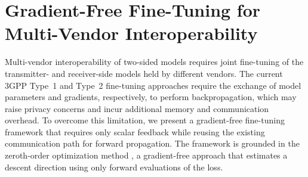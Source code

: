 \documentclass[10pt,twocolumn]{IEEEtran}
\begin{document}






\section{Gradient-Free Fine-Tuning for Multi-Vendor Interoperability}
Multi-vendor interoperability of two-sided models requires joint fine-tuning of the transmitter- and receiver-side models held by different vendors. The current 3GPP Type~1 and Type~2 fine-tuning approaches \cite{3gpp_tr38843_rel19} require the exchange of model parameters and gradients, respectively, to perform backpropagation, which may raise privacy concerns and incur additional memory and communication overhead. To overcome this limitation, we present a gradient-free fine-tuning framework that requires only scalar feedback while reusing the existing communication path for forward propagation. The framework is grounded in the zeroth-order optimization method \cite{chen2025zeroth}, a gradient-free approach that estimates a descent direction using only forward evaluations of the loss. 
\end{document}

